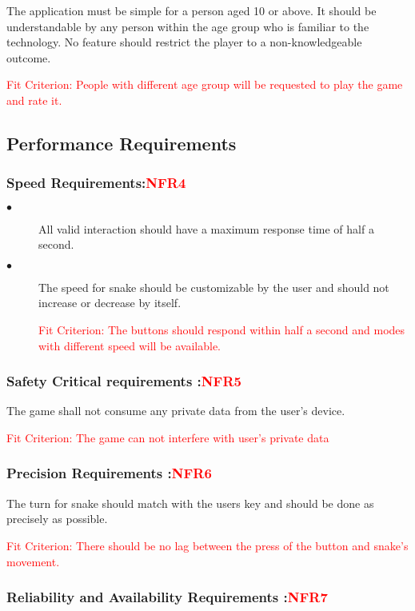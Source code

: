 \documentclass[12pt, titlepage]{article}
\begin{document}
The application must be simple for a person aged 10 or above. It should be understandable by any person within the age group who is familiar to the technology. No feature should restrict the player to a non-knowledgeable outcome.

\textcolor{red}{Fit Criterion: People with different age group will be requested to play the game and rate it.}
\subsection{Performance Requirements}

\subsubsection{Speed Requirements:\textcolor{red}{NFR4}}

\begin{description}
	
	\item[$\bullet$] All valid interaction should have a maximum response time of half a second.
	
	\item[$\bullet$] The speed for snake should be customizable by the user and should not increase or decrease by itself.
	
	\textcolor{red}{Fit Criterion: The buttons should respond within half a second and modes with different speed will be available.}
\end{description}

\subsubsection{Safety Critical requirements :\textcolor{red}{NFR5}}

The game shall not consume any private data from the user's device. 

\textcolor{red}{Fit Criterion: The game can not interfere with user's private data}
\subsubsection{Precision Requirements :\textcolor{red}{NFR6}}

 The turn for snake should match with the users key and should be done as precisely as possible.

\textcolor{red}{Fit Criterion: There should be no lag between the press of the button and snake's movement.}
\subsubsection{Reliability and Availability Requirements :\textcolor{red}{NFR7}}
\end{document}
